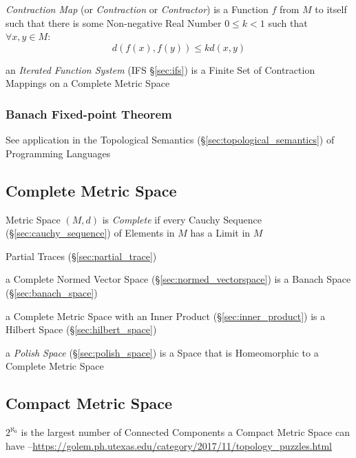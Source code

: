 \emph{Contraction Map} (or \emph{Contraction} or \emph{Contractor}) is a
Function $f$ from $M$ to itself such that there is some Non-negative Real Number
$0 \leq k < 1$ such that $\forall x,y \in M$:
\[
  d(f(x),f(y)) \leq k d(x,y)
\]

\fist an \emph{Iterated Function System} (IFS \S\ref{sec:ifs}) is a Finite Set
of Contraction Mappings on a Complete Metric Space



\subsubsection{Banach Fixed-point Theorem}\label{sec:banach_fixedpoint}

\fist See application in the Topological Semantics
(\S\ref{sec:topological_semantics}) of Programming Languages



\subsection{Complete Metric Space}\label{sec:complete_metric_space}

Metric Space $(M,d)$ is \emph{Complete} if every Cauchy Sequence
(\S\ref{sec:cauchy_sequence}) of Elements in $M$ has a Limit in $M$

Partial Traces (\S\ref{sec:partial_trace})

a Complete Normed Vector Space (\S\ref{sec:normed_vectorspace}) is a Banach
Space (\S\ref{sec:banach_space})

a Complete Metric Space with an Inner Product (\S\ref{sec:inner_product}) is a
Hilbert Space (\S\ref{sec:hilbert_space})

a \emph{Polish Space} (\S\ref{sec:polish_space}) is a Space that is Homeomorphic
to a Complete Metric Space



\subsection{Compact Metric Space}\label{sec:compact_metric_space}

$2^{\aleph_0}$ is the largest number of Connected Components a Compact Metric
Space can have
--\url{https://golem.ph.utexas.edu/category/2017/11/topology_puzzles.html}



